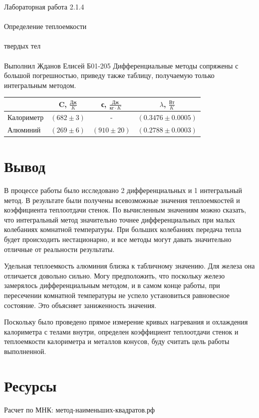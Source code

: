 \documentclass{astroedu-lab}
\begin{document}
\begin{problem}{\huge Лабораторная работа 2.1.4\\\\Определение теплоемкости\\\\твердых тел\\\\Выполнил Жданов Елисей Б01-205}
Дифференциальные методы сопряжены с большой погрешностью, приведу также таблицу, получаемую только интегральным методом.

\begin{center}
\begin{tabular}{|l|c|c|c|}
\hline
& C, $\frac{\text{Дж}}{K}$ & с, $\frac{\text{Дж}}{\text{кг} \cdot K}$ & $\lambda$, $\frac{\text{Вт}}{K}$ \\
\hline
Калориметр & $(682 \pm 3)$ & - & $(0.3476 \pm 0.0005)$ \\
\hline
Алюминий & $(269 \pm 6)$ & $(910 \pm 20)$ & $(0.2788 \pm 0.0003)$ \\
\hline
\end{tabular}
\end{center}

\section{Вывод}

В процессе работы было исследовано 2 дифференциальных и 1 интегральный метод. В результате были получены всевозможные значения теплоемкостей и коэффициента теплоотдачи стенок. По вычисленным значениям можно сказать, что интегральный метод значительно точнее дифференциальных при малых колебаниях комнатной температуры. При больших колебаниях передача тепла будет происходить нестационарно, и все методы могут давать значительно отличные от реальности результаты.

Удельная теплоемкость алюминия близка к табличному значению. Для железа она отличается довольно сильно. Могу предположить, что поскольку железо замерялось дифференциальным методом, и в самом конце работы, при пересечении комнатной температуры не успело установиться равновесное состояние. Это объясняет заниженность значения.

Поскольку было проведено прямое измерение кривых нагревания и охлаждения калориметра с телами внутри, определен коэффициент теплоотдачи стенок и теплоемкости калориметра и металлов конусов, буду считать цель работы выполненной.

\section{Ресурсы}

Расчет по МНК: метод-наименьших-квадратов.рф


\end{problem}
\end{document}
